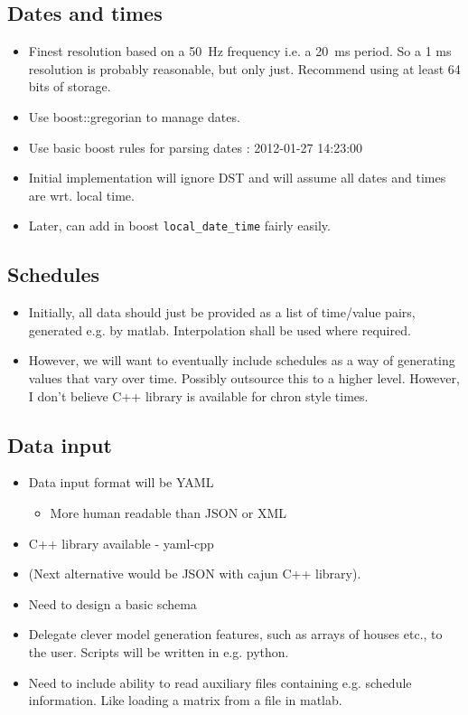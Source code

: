 \documentclass[12pt]{article}
\newcommand{\itm}[1]{\begin{itemize}#1\end{itemize}}
\begin{document}
\subsection{Dates and times}
\itm{
	\item Finest resolution based on a 50~Hz frequency i.e. a 20~ms period. So a 1 ms resolution is probably reasonable, but only just. Recommend using at least 64 bits of storage.
	\item Use boost::gregorian to manage dates.
	\item Use basic boost rules for parsing dates : 2012-01-27 14:23:00
	\item Initial implementation will ignore DST and will assume all dates and times are wrt. local time.
	\item Later, can add in boost \texttt{local\_date\_time} fairly easily.
}

\subsection{Schedules}
\itm{
	\item Initially, all data should just be provided as a list of time/value pairs, generated e.g. by matlab. Interpolation shall be used where required.
	\item However, we will want to eventually include schedules as a way of generating values that vary over time. Possibly outsource this to a higher level. However, I don't believe C++ library is available for chron style times.
}

\subsection{Data input}
\itm{
	\item Data input format will be YAML
	\itm{
		\item More human readable than JSON or XML
	}
	\item C++ library available - yaml-cpp
	\item (Next alternative would be JSON with cajun C++ library).
	\item Need to design a basic schema
	\item Delegate clever model generation features, such as arrays of houses etc., to the user. Scripts will be written in e.g. python.
	\item Need to include ability to read auxiliary files containing e.g. schedule information. Like loading a matrix from a file in matlab.
}
\end{document}
